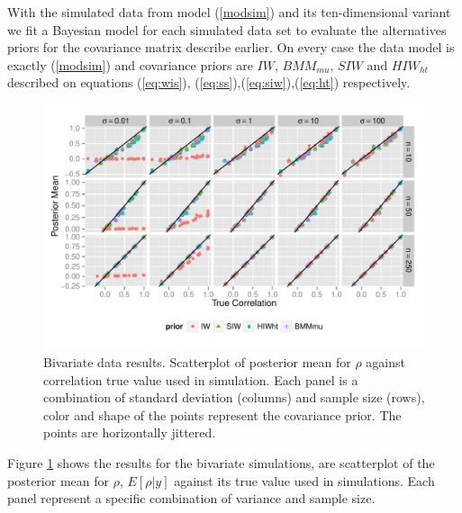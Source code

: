 \documentclass[a4paper]{article}
\begin{document}
With the simulated data from model (\ref{modsim}) and its ten-dimensional variant we fit a Bayesian model for each simulated data set to evaluate the alternatives priors for the covariance matrix describe earlier.  On every case the data model is exactly (\ref{modsim}) and covariance priors are $IW$, $BMM_{mu}$, $SIW$ and $HIW_{ht}$ described on equations (\ref{eq:wis}), (\ref{eq:ss}),(\ref{eq:siw}),(\ref{eq:ht}) respectively.   
\begin{figure}[hbtp]
   \centering
   \includegraphics[width=\textwidth] {fig_rho_d2} 
    \vspace{-.5in}
   \caption{Bivariate data results. Scatterplot of posterior mean for $\rho$  against correlation true value used in simulation. Each panel is a combination of standard deviation (columns) and sample size (rows),  color and shape of the points represent the covariance prior. The points are horizontally jittered. \label{rhod2}}
\end{figure}

Figure \ref{rhod2} shows the results for the bivariate simulations, are scatterplot of the posterior mean for $\rho$, $E[\rho\vert y]$ against its true value used in simulations.  Each panel represent a specific combination of variance and sample size.  
\end{document}
